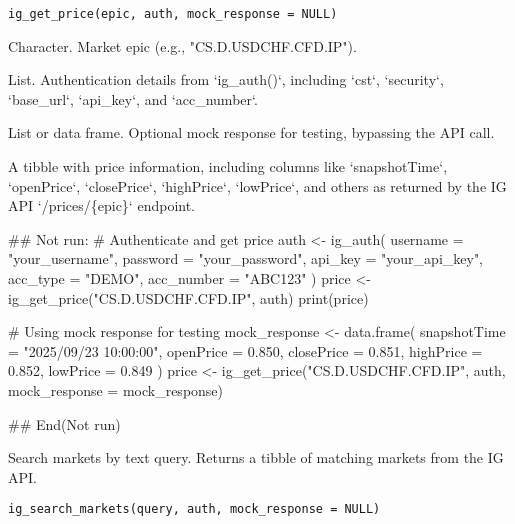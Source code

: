 \documentclass[a4paper]{book}
\begin{document}
%
\begin{Usage}
\begin{verbatim}
ig_get_price(epic, auth, mock_response = NULL)
\end{verbatim}
\end{Usage}
%
\begin{Arguments}
\begin{ldescription}
\item[\code{epic}] Character. Market epic (e.g., "CS.D.USDCHF.CFD.IP").

\item[\code{auth}] List. Authentication details from `ig\_auth()`, including `cst`, `security`, `base\_url`, `api\_key`, and `acc\_number`.

\item[\code{mock\_response}] List or data frame. Optional mock response for testing, bypassing the API call.
\end{ldescription}
\end{Arguments}
%
\begin{Value}
A tibble with price information, including columns like `snapshotTime`, `openPrice`, `closePrice`, `highPrice`, `lowPrice`, and others as returned by the IG API `/prices/\{epic\}` endpoint.
\end{Value}
%
\begin{Examples}
\begin{ExampleCode}
## Not run: 
# Authenticate and get price
auth <- ig_auth(
  username = "your_username",
  password = "your_password",
  api_key = "your_api_key",
  acc_type = "DEMO",
  acc_number = "ABC123"
)
price <- ig_get_price("CS.D.USDCHF.CFD.IP", auth)
print(price)

# Using mock response for testing
mock_response <- data.frame(
  snapshotTime = "2025/09/23 10:00:00",
  openPrice = 0.850,
  closePrice = 0.851,
  highPrice = 0.852,
  lowPrice = 0.849
)
price <- ig_get_price("CS.D.USDCHF.CFD.IP", auth, mock_response = mock_response)

## End(Not run)

\end{ExampleCode}
\end{Examples}
%
\begin{Description}
Search markets by text query. Returns a tibble of matching markets from the IG API.
\end{Description}
%
\begin{Usage}
\begin{verbatim}
ig_search_markets(query, auth, mock_response = NULL)
\end{verbatim}
\end{Usage}
\end{document}
